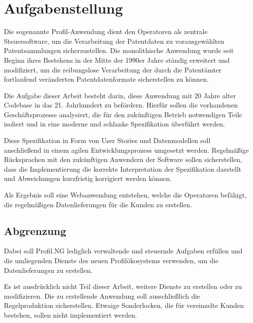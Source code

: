 
\chapter{Aufgabenstellung} %

\label{ch:aufgabenstellung} %


Die sogenannte Profil-Anwendung dient den Operatoren als zentrale
Steuersoftware, um die Verarbeitung der Patentdaten zu vorausgewählten
Patentsammlungen sicherzustellen. Die monolithische Anwendung wurde seit Beginn
ihres Bestehens in der Mitte der 1990er Jahre ständig erweitert und modifiziert,
um die reibungslose Verarbeitung der durch die Patentämter fortlaufend
veränderten Patentdatenformate sicherstellen zu können.

Die Aufgabe dieser Arbeit besteht darin, diese Anwendung mit 20 Jahre alter
Codebase in das 21. Jahrhundert zu befördern. Hierfür sollen die vorhandenen
Geschäftsprozesse analysiert, die für den zukünftigen Betrieb notwendigen Teile
isoliert und in eine moderne und schlanke Spezifikation überführt werden.

Diese Spezifikation in Form von User Stories und Datenmodellen soll anschließend
in einem agilen Entwicklungsprozess umgesetzt werden. Regelmäßige Rücksprachen
mit den zukünftigen Anwendern der Software sollen sicherstellen, dass die
Implementierung die korrekte Interpretation der Spezifikation darstellt und
Abweichungen kurzfristig korrigiert werden können.

Als Ergebnis soll eine Webanwendung entstehen, welche die Operatoren befähigt,
die regelmäßigen Datenlieferungen für die Kunden zu erstellen.

\section{Abgrenzung}

Dabei soll Profil.NG lediglich verwaltende und steuernde Aufgaben erfüllen und
die  umliegenden Dienste des neuen Profilökosystems verwenden, um die
Datenlieferungen zu erstellen.

Es ist ausdrücklich nicht Teil dieser Arbeit, weitere Dienste zu erstellen oder
zu modifizieren. Die zu erstellende Anwendung soll ausschließlich die
Regelproduktion sicherstellen. Etwaige Sonderlocken, die für vereinzelte Kunden
bestehen, sollen nicht implementiert werden.
